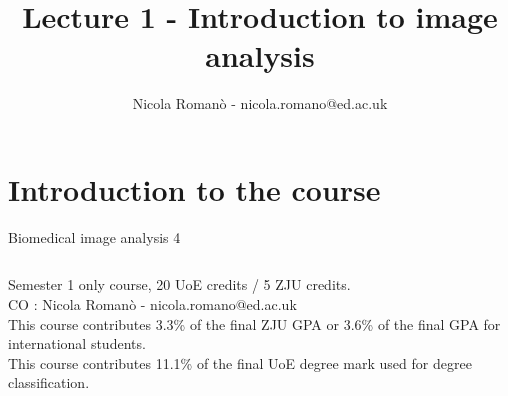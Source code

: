 \documentclass[9pt, aspectratio=169]{beamer}
\author{Nicola Roman\`o - nicola.romano@ed.ac.uk}
\title{Lecture 1 - Introduction to image analysis}
\date{}
\begin{document}

\begin{frame}
    \titlepage
\end{frame}

\section{Introduction to the course}

\begin{frame}
    {Biomedical image analysis 4}

    \begin{columns}
        \begin{column}{0.6\textwidth}
            Semester 1 only course, 20 UoE credits / 5 ZJU credits.\\
            CO : Nicola Roman\`o - nicola.romano@ed.ac.uk\\
            \vspace{2em}
            This course contributes 3.3\% of the final ZJU GPA or 3.6\% of the final GPA for international students.\\
            \vspace{2em}
            This course contributes 11.1\% of the final UoE degree mark used for degree classification.\\
            \vspace{2em}


\end{column}
\end{columns}
\end{frame}
\end{document}
